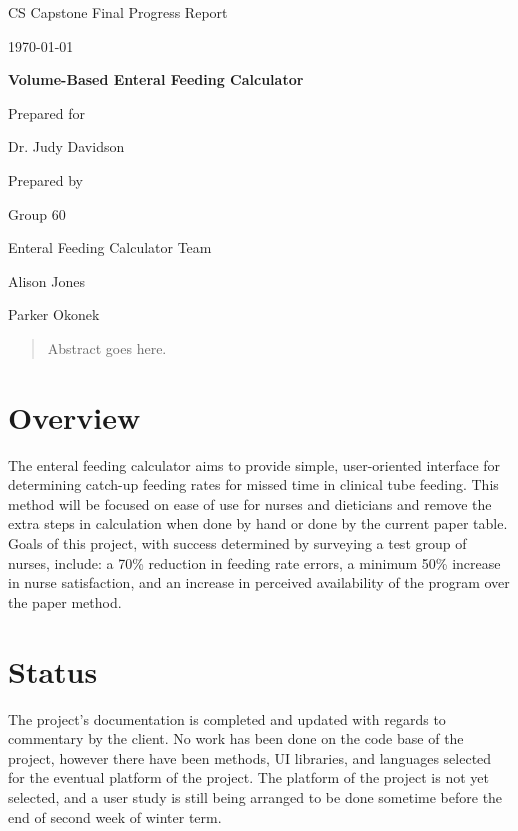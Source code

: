 \documentclass[onecolumn, draftclsnofoot,10pt, compsoc]{IEEEtran}
\def \CapstoneTeamName{		Enteral Feeding Calculator Team}
\def \CapstoneTeamNumber{		60}
\def \GroupMemberOne{			Alison Jones}
\def \GroupMemberTwo{			Parker Okonek}
\def \CapstoneProjectName{		Volume-Based Enteral Feeding Calculator}
\def \CapstoneSponsorPerson{		Dr. Judy Davidson}
\def \DocType{
				Final Progress Report
				}
\newcommand{\NameSigPair}[1]{\par
\makebox[2.75in][r]{#1} \hfil 	\makebox[3.25in]{\makebox[2.25in]{\hrulefill} \hfill		\makebox[.75in]{\hrulefill}}
\par\vspace{-12pt} \textit{\tiny\noindent
\makebox[2.75in]{} \hfil		\makebox[3.25in]{\makebox[2.25in][r]{Signature} \hfill	\makebox[.75in][r]{Date}}}}
\renewcommand{\NameSigPair}[1]{#1}
\begin{document}
\begin{titlepage}
    \begin{singlespace}
        \hfill 
        \par\vspace{.2in}
        \centering
        \scshape{
            \huge CS Capstone \DocType \par
            {\large\today}\par
            \vspace{.5in}
            \textbf{\Huge\CapstoneProjectName}\par
            \vfill
            {\large Prepared for}\par
            {\Large\NameSigPair{\CapstoneSponsorPerson}\par}
            {\large Prepared by }\par
            Group\CapstoneTeamNumber\par
            \CapstoneTeamName\par 
            \vspace{5pt}
            {\Large
                \NameSigPair{\GroupMemberOne}\par
                \NameSigPair{\GroupMemberTwo}\par
            }
            \vspace{20pt}
        }
        \begin{abstract}%
        Abstract goes here.
        \end{abstract}     
    \end{singlespace}
\end{titlepage}
\newpage
{}
\clearpage
\section{Overview}
The enteral feeding calculator aims to provide simple, user-oriented interface for determining catch-up feeding rates for missed time in clinical tube feeding.
This method will be focused on ease of use for nurses and dieticians and remove the extra steps in calculation when done by hand or done by the current paper table.
Goals of this project, with success determined by surveying a test group of nurses, include: a 70\% reduction in feeding rate errors, a minimum 50\% increase in nurse satisfaction, and an increase in perceived availability of the program over the paper method.
\section{Status}
The project's documentation is completed and updated with regards to commentary by the client.
No work has been done on the code base of the project, however there have been methods, UI libraries, and languages selected for the eventual platform of the project.
The platform of the project is not yet selected, and a user study is still being arranged to be done sometime before the end of second week of winter term.
\end{document}
